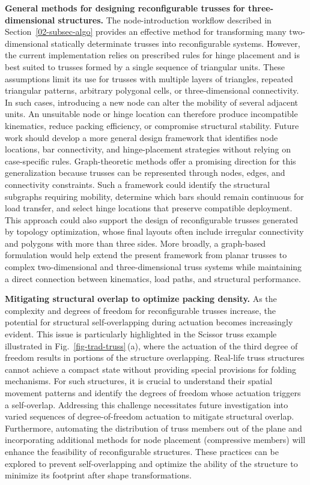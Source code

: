 \noindent{}\textbf{General methods for designing reconfigurable trusses for three-dimensional structures.}
The node-introduction workflow described in Section~\ref{02-subsec-algo} provides an effective method for transforming many two-dimensional statically determinate trusses into reconfigurable systems. However, the current implementation relies on prescribed rules for hinge placement and is best suited to trusses formed by a single sequence of triangular units. These assumptions limit its use for trusses with multiple layers of triangles, repeated triangular patterns, arbitrary polygonal cells, or three-dimensional connectivity. In such cases, introducing a new node can alter the mobility of several adjacent units. An unsuitable node or hinge location can therefore produce incompatible kinematics, reduce packing efficiency, or compromise structural stability. Future work should develop a more general design framework that identifies node locations, bar connectivity, and hinge-placement strategies without relying on case-specific rules. Graph-theoretic methods offer a promising direction for this generalization because trusses can be represented through nodes, edges, and connectivity constraints. Such a framework could identify the structural subgraphs requiring mobility, determine which bars should remain continuous for load transfer, and select hinge locations that preserve compatible deployment. This approach could also support the design of reconfigurable trusses generated by topology optimization, whose final layouts often include irregular connectivity and polygons with more than three sides. More broadly, a graph-based formulation would help extend the present framework from planar trusses to complex two-dimensional and three-dimensional truss systems while maintaining a direct connection between kinematics, load paths, and structural performance.

\noindent{}\textbf{Mitigating structural overlap to optimize packing density.} As the complexity and degrees of freedom for reconfigurable trusses increase, the potential for structural self-overlapping during actuation becomes increasingly evident. This issue is particularly highlighted in the Scissor truss example illustrated in Fig.~\ref{fig-trad-truss}\,(a), where the actuation of the third degree of freedom results in portions of the structure overlapping. Real-life truss structures cannot achieve a compact state without providing special provisions for folding mechanisms. For such structures, it is crucial to understand their spatial movement patterns and identify the degrees of freedom whose actuation triggers a self-overlap. Addressing this challenge necessitates future investigation into varied sequences of degree-of-freedom actuation to mitigate structural overlap. Furthermore, automating the distribution of truss members out of the plane and incorporating additional methods for node placement (compressive members) will enhance the feasibility of reconfigurable structures. These practices can be explored to prevent self-overlapping and optimize the ability of the structure to minimize its footprint after shape transformations.


